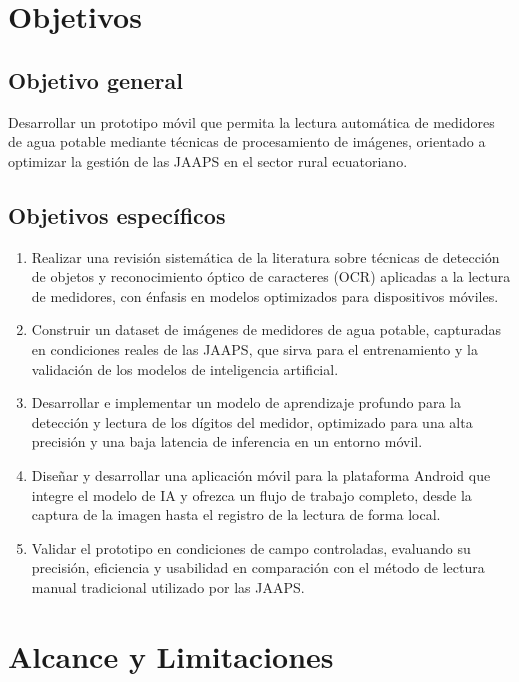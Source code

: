 \section{Objetivos}
\label{sec:objectives}

\subsection{Objetivo general}
\label{ssec:general_objective}

Desarrollar un prototipo móvil que permita la lectura automática de medidores de agua potable mediante técnicas de procesamiento de imágenes, orientado a optimizar la gestión de las JAAPS en el sector rural ecuatoriano.

\subsection{Objetivos específicos}
\label{ssec:specific_objectives}

\begin{enumerate}
\item Realizar una revisión sistemática de la literatura sobre técnicas de detección de objetos y reconocimiento óptico de caracteres (OCR) aplicadas a la lectura de medidores, con énfasis en modelos optimizados para dispositivos móviles.
\item Construir un dataset de imágenes de medidores de agua potable, capturadas en condiciones reales de las JAAPS, que sirva para el entrenamiento y la validación de los modelos de inteligencia artificial.
\item Desarrollar e implementar un modelo de aprendizaje profundo para la detección y lectura de los dígitos del medidor, optimizado para una alta precisión y una baja latencia de inferencia en un entorno móvil.
\item Diseñar y desarrollar una aplicación móvil para la plataforma Android que integre el modelo de IA y ofrezca un flujo de trabajo completo, desde la captura de la imagen hasta el registro de la lectura de forma local.
\item Validar el prototipo en condiciones de campo controladas, evaluando su precisión, eficiencia y usabilidad en comparación con el método de lectura manual tradicional utilizado por las JAAPS.
\end{enumerate}

\section{Alcance y Limitaciones}
\label{sec:scope_limitations}

